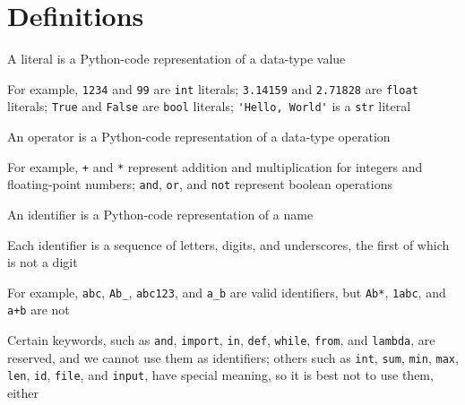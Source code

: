 \documentclass[8pt,a4paper,compress]{beamer}
\begin{document}
\section{Definitions}
\begin{frame}[fragile]
\pause

A literal is a Python-code representation of a data-type value

\pause\bigskip

For example, \lstinline{1234} and \lstinline{99} are \lstinline{int} literals; \lstinline{3.14159} and \lstinline{2.71828} are \lstinline{float} literals; \lstinline{True} and \lstinline{False} are \lstinline{bool} literals; \lstinline{'Hello, World'} is a \lstinline{str} literal

\pause\bigskip

An operator is a Python-code representation of a data-type operation

\pause\bigskip

For example, \lstinline{+} and \lstinline{*} represent addition and multiplication for integers and floating-point numbers; \lstinline{and}, \lstinline{or}, and \lstinline{not} represent boolean operations

\pause\bigskip

An identifier is a Python-code representation of a name

\pause\bigskip

Each identifier is a sequence of letters, digits, and underscores, the first of which is not a digit

\pause\bigskip

For example, \lstinline{abc}, \lstinline{Ab_}, \lstinline{abc123}, and \lstinline{a_b} are valid identifiers, but \lstinline{Ab*}, \lstinline{1abc}, and \lstinline{a+b} are not

\pause\bigskip

Certain keywords, such as \lstinline{and}, \lstinline{import}, \lstinline{in}, \lstinline{def}, \lstinline{while}, \lstinline{from}, and \lstinline{lambda}, are reserved, and we cannot use them as identifiers; others such as \lstinline{int}, \lstinline{sum}, \lstinline{min}, \lstinline{max}, \lstinline{len}, \lstinline{id}, \lstinline{file}, and \lstinline{input}, have special meaning, so it is best not to use them, either
\end{frame}
\end{document}

